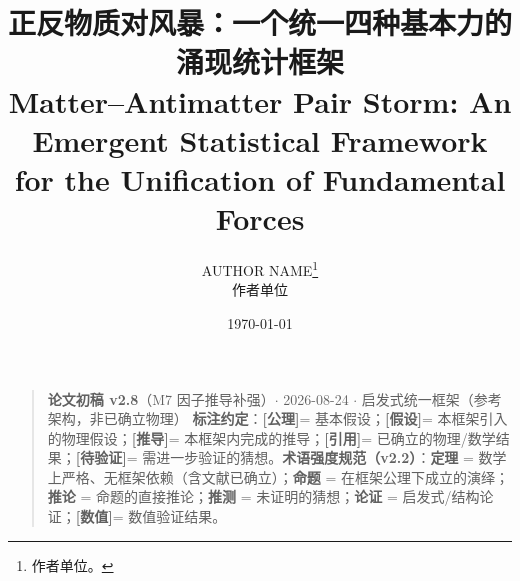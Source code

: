 \documentclass[12pt]{article}
\title{正反物质对风暴：一个统一四种基本力的涌现统计框架 \\ Matter--Antimatter Pair Storm: An Emergent Statistical Framework for the Unification of Fundamental Forces}
\author{AUTHOR NAME\thanks{作者单位。} \\ \small 作者单位}
\date{\today}
\newcommand{\mtag}[1]{\textbf{[#1]}}
\begin{document}
\maketitle



\begin{quote}
\textbf{论文初稿 v2.8}（M7 因子推导补强）\ensuremath{\cdot} 2026-08-24 \ensuremath{\cdot} 启发式统一框架（参考架构，非已确立物理）
\textbf{标注约定}：\mtag{公理}= 基本假设；\mtag{假设}= 本框架引入的物理假设；\mtag{推导}= 本框架内完成的推导；\mtag{引用}= 已确立的物理/数学结果；\mtag{待验证}= 需进一步验证的猜想。\textbf{术语强度规范（v2.2）}：\textbf{定理} = 数学上严格、无框架依赖（含文献已确立）；\textbf{命题} = 在框架公理下成立的演绎；\textbf{推论} = 命题的直接推论；\textbf{推测} = 未证明的猜想；\textbf{论证} = 启发式/结构论证；\mtag{数值}= 数值验证结果。
\end{quote}
\end{document}
